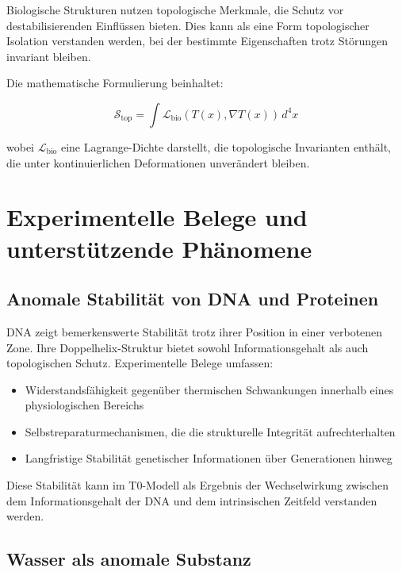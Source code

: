 \documentclass[12pt,a4paper]{article}
\newcommand{\Tfield}{T(x)}
\begin{document}
	Biologische Strukturen nutzen topologische Merkmale, die Schutz vor destabilisierenden Einflüssen bieten. Dies kann als eine Form topologischer Isolation verstanden werden, bei der bestimmte Eigenschaften trotz Störungen invariant bleiben.
	
	Die mathematische Formulierung beinhaltet:
	
	\begin{equation}
		\mathcal{S}_{\text{top}} = \int \mathcal{L}_{\text{bio}}(\Tfield, \nabla\Tfield) \, d^4x
	\end{equation}
	
	wobei \(\mathcal{L}_{\text{bio}}\) eine Lagrange-Dichte darstellt, die topologische Invarianten enthält, die unter kontinuierlichen Deformationen unverändert bleiben.
	
	\section{Experimentelle Belege und unterstützende Phänomene}
	\label{sec:experimental_evidence}
	
	\subsection{Anomale Stabilität von DNA und Proteinen}
	\label{subsec:dna_stability}
	
	DNA zeigt bemerkenswerte Stabilität trotz ihrer Position in einer verbotenen Zone. Ihre Doppelhelix-Struktur bietet sowohl Informationsgehalt als auch topologischen Schutz. Experimentelle Belege umfassen:
	
	\begin{itemize}
		\item Widerstandsfähigkeit gegenüber thermischen Schwankungen innerhalb eines physiologischen Bereichs
		\item Selbstreparaturmechanismen, die die strukturelle Integrität aufrechterhalten
		\item Langfristige Stabilität genetischer Informationen über Generationen hinweg
	\end{itemize}
	
	Diese Stabilität kann im T0-Modell als Ergebnis der Wechselwirkung zwischen dem Informationsgehalt der DNA und dem intrinsischen Zeitfeld verstanden werden.
	
	\subsection{Wasser als anomale Substanz}
	\label{subsec:water_anomalies}
	
\end{document}
